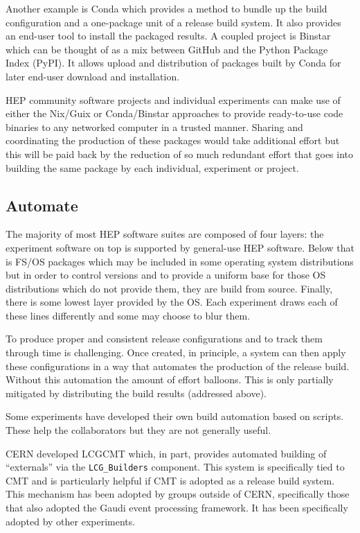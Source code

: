 Another example is Conda which provides a method to bundle up the
build configuration and a one-package unit of a release build system.
It also provides an end-user tool to install the packaged results.  A
coupled project is Binstar which can be thought of as a mix between
GitHub and the Python Package Index (PyPI).  It allows upload and
distribution of packages built by Conda for later end-user download
and installation.

HEP community software projects and individual experiments can make
use of either the Nix/Guix or Conda/Binstar approaches to provide
ready-to-use code binaries to any networked computer in a trusted
manner.
%
Sharing and coordinating the production of these packages would take
additional effort but this will be paid back by the reduction of so
much redundant effort that goes into building the same package by each
individual, experiment or project.


\subsection{Automate}

The majority of most HEP software suites are composed of four layers:
the experiment software on top is supported by general-use HEP
software.  Below that is FS/OS packages which may be included in some
operating system distributions but in order to control versions and to
provide a uniform base for those OS distributions which do not provide
them, they are build from source.  Finally, there is some lowest layer
provided by the OS.  Each experiment draws each of these lines
differently and some may choose to blur them.

To produce proper and consistent release configurations and to track
them through time is challenging.  Once created, in principle, a
system can then apply these configurations in a way that automates the
production of the release build.  Without this automation the amount
of effort balloons.  This is only partially mitigated by distributing
the build results (addressed above).

Some experiments have developed their own build automation based on
scripts.  These help the collaborators but they are not generally
useful.

CERN developed LCGCMT which, in part, provides automated building of
``externals'' via the \verb|LCG_Builders| component.  This system is
specifically tied to CMT and is particularly helpful if CMT is adopted
as a release build system.  This mechanism has been adopted by groups
outside of CERN, specifically those that also adopted the Gaudi event
processing framework.  It has been specifically adopted by other
experiments.

